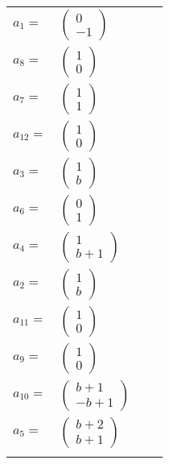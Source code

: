 \documentclass[1p]{elsarticle_modified}
\theoremstyle{definition}
\begin{document}
\begin{tabular}{m{7pt} m{180pt} m{7pt} m{180pt} }
\flushright $a_{1}=$&$\begin{pmatrix}0\\-1\end{pmatrix}$ \\
\flushright $a_{8}=$&$\begin{pmatrix}1\\0\end{pmatrix}$ \\
\flushright $a_{7}=$&$\begin{pmatrix}1\\1\end{pmatrix}$ \\
\flushright $a_{12}=$&$\begin{pmatrix}1\\0\end{pmatrix}$ \\
\flushright $a_{3}=$&$\begin{pmatrix}1\\b\end{pmatrix}$ \\
\flushright $a_{6}=$&$\begin{pmatrix}0\\1\end{pmatrix}$ \\
\flushright $a_{4}=$&$\begin{pmatrix}1\\b+1\end{pmatrix}$ \\
\flushright $a_{2}=$&$\begin{pmatrix}1\\b\end{pmatrix}$ \\
\flushright $a_{11}=$&$\begin{pmatrix}1\\0\end{pmatrix}$ \\
\flushright $a_{9}=$&$\begin{pmatrix}1\\0\end{pmatrix}$ \\
\flushright $a_{10}=$&$\begin{pmatrix}b+1\\- b+1\end{pmatrix}$ \\
\flushright $a_{5}=$&$\begin{pmatrix}b+2\\b+1\end{pmatrix}$\\&\end{tabular}
\end{document}
